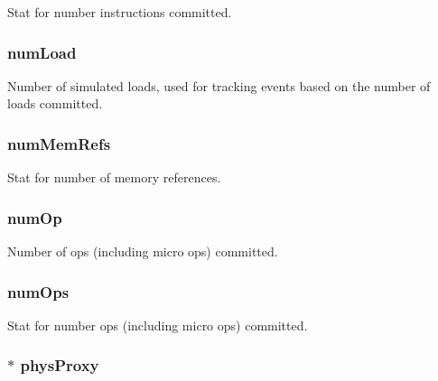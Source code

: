 \label{structThreadState_a302bf9a6fd3b54c46eb3e2bfb18a320e}
Stat for number instructions committed. \hypertarget{structThreadState_a9c78b70028e5df92b15a6fd9c56e5acf}{
\subsubsection[{numLoad}]{ {\bf numLoad}}}
\label{structThreadState_a9c78b70028e5df92b15a6fd9c56e5acf}
Number of simulated loads, used for tracking events based on the number of loads committed. \hypertarget{structThreadState_a6102e519d600e5e0f2d310d628f9a361}{
\subsubsection[{numMemRefs}]{ {\bf numMemRefs}}}
\label{structThreadState_a6102e519d600e5e0f2d310d628f9a361}
Stat for number of memory references. \hypertarget{structThreadState_a0cb2e6732f2a0039cb918fc50956616a}{
\subsubsection[{numOp}]{ {\bf numOp}}}
\label{structThreadState_a0cb2e6732f2a0039cb918fc50956616a}
Number of ops (including micro ops) committed. \hypertarget{structThreadState_a121c14c0d2e80edfe1e3d01031707c0b}{
\subsubsection[{numOps}]{ {\bf numOps}}}
\label{structThreadState_a121c14c0d2e80edfe1e3d01031707c0b}
Stat for number ops (including micro ops) committed. \hypertarget{structThreadState_a1020d50e51f5a51af704e2a92c228f76}{
\subsubsection[{physProxy}]{$\ast$ {\bf physProxy}}}
